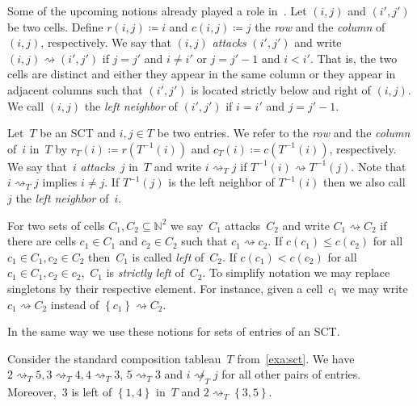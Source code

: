 \documentclass[ALCO,ThmDefs,Unicode,epreuves]{cedram}
\newcommand{\N}{\mathbb N}
\newcommand{\set}[1]{\left\{ #1 \right\}}
\newcommand{\att}{\rightsquigarrow}
\newcommand{\natt}{\not \rightsquigarrow}
\begin{document}
Some of the upcoming notions already played a role in~\cite{Tewari2015}.
Let $(i,j)$ and $(i',j')$ be two cells.
Define $r(i,j) \coloneqq i$ and $c(i,j) \coloneqq j$ the \emph{row} and the \emph{column} of $(i,j)$, respectively. 
We say that $(i,j)$ \emph{attacks} $(i',j')$ and write $(i,j)\att (i',j')$ if $j=j'$ and $i\neq i'$ or $j = j'-1$ and $i<i'$.
That is, the two cells are distinct and either they appear in the same column or they appear in adjacent columns such that $(i',j')$ is located strictly below and right of $(i,j)$.
We call $(i,j)$ the \emph{left neighbor} of $(i',j')$ if $i=i'$ and $j = j'-1$.

Let~$T$ be an SCT and $i,j\in T$ be two entries.
We refer to the \emph{row} and the \emph{column} of~$i$ in~$T$ by $r_T(i) \coloneqq r(T^{-1}(i))$ and $c_T(i)\coloneqq c(T^{-1}(i))$, respectively. 
We say that~$i$ \emph{attacks}~$j$ in~$T$ and write $i\att_T j$ if $T^{-1}(i) \att T^{-1}(j)$.
Note that $i\att_T j$ implies $i\neq j$. 
If $T^{-1}(j)$ is the left neighbor of $T^{-1}(i)$ then we also call~$j$ the \emph{left neighbor} of~$i$.

For two sets of cells $C_1, C_2 \subseteq \N^2$ we say~$C_1$ attacks~$C_2$ and write $C_1 \att C_2$ if there are cells $c_1\in C_1$ and $c_2 \in C_2$ such that $c_1 \att c_2$. 
If $c(c_1)\leq c(c_2)$ for all $c_1\in C_1, c_2\in C_2$ then~$C_1$ is called \emph{left} of~$C_2$. If $c(c_1)< c(c_2)$ for all $c_1\in C_1, c_2\in c_2$,~$C_1$ is \emph{strictly left} of~$C_2$.
To simplify notation we may replace singletons by their respective element.
For instance, given a cell~$c_1$ we may write $c_1 \att C_2$ instead of $\set{c_1} \att C_2$.

In the same way we use these notions for sets of entries of an SCT.

\begin{exam}
		Consider the standard composition tableau~$T$ from~\cref{exa:sct}. We have $2\att_T 5, 3\att_T 4, 4\att_T 3$, $5\att_T 3$ and $i\natt_T j$ for all other pairs of entries. Moreover,~$3$ is left of $\set{1,4}$ in~$T$ and $2\att_T \set{3,5}$.
\end{exam}
\end{document}
